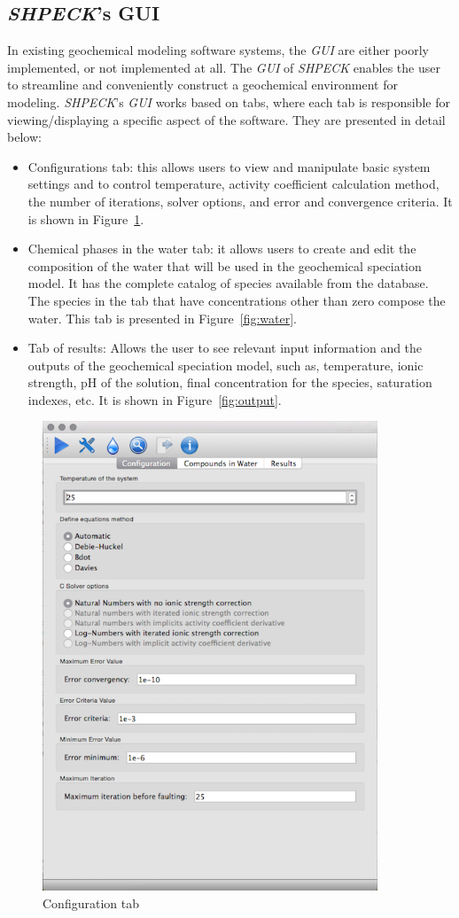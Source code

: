 \subsection{\emph{SHPECK}'s GUI}
In existing geochemical modeling software systems, the \emph{GUI} are either poorly implemented, or not implemented at all. The \emph{GUI} of \emph{SHPECK} enables the user to streamline and conveniently construct a geochemical environment for modeling. \emph{SHPECK}'s \emph{GUI} works based on tabs, where each tab is responsible for viewing/displaying a specific aspect of the software. They are presented in detail below:
\begin{itemize}
\item Configurations tab: this allows users to view and manipulate basic system settings and to control temperature, activity coefficient calculation method, the number of iterations, solver options, and error and convergence criteria. It is shown in  Figure~\ref{fig:config}.
\item Chemical phases in the water tab: it allows users to create and edit the composition of the water that will be used in the geochemical speciation model. It has the complete catalog of species available from the database. The species in the tab that have concentrations other than zero compose the water. This tab is presented in Figure~\ref{fig:water}.
\item Tab of results: Allows the user to see relevant input information and the outputs of the geochemical speciation model, such as, temperature, ionic strength, pH of the solution, final concentration for the species, saturation indexes, etc. It is shown in  Figure~\ref{fig:output}.
\end{itemize}


\begin{figure}[ht!]
\centering
\includegraphics[width=100mm]{figures/shpeck-configtab.png}
\caption{Configuration tab}
\label{fig:config}
\end{figure}

